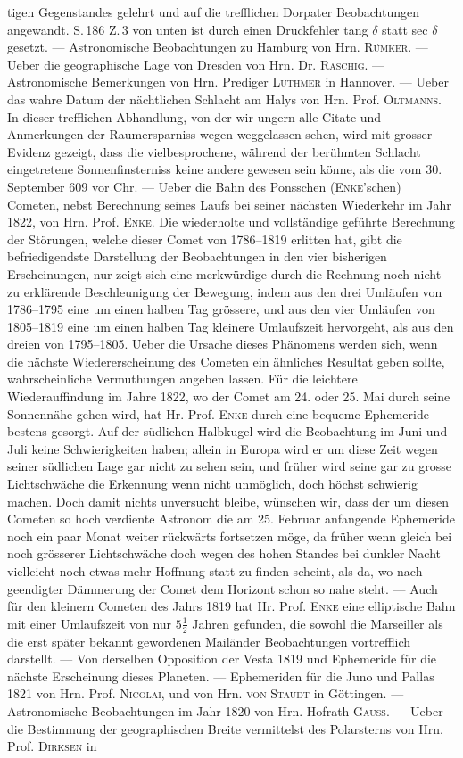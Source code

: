 \noindent tigen Gegenstandes gelehrt und auf die trefflichen Dorpater Beobachtungen angewandt. S.\,186 Z.\,3 von unten ist durch einen Druckfehler tang $\delta$ statt sec $\delta$ gesetzt. --- Astronomische Beobachtungen zu Hamburg von Hrn. \textsc{Rümker}. --- Ueber die geographische Lage von Dresden von Hrn. Dr. \textsc{Raschig}. --- Astronomische Bemerkungen von Hrn. Prediger \textsc{Luthmer} in Hannover. --- Ueber das wahre Datum der nächtlichen Schlacht am Halys von Hrn. Prof. \textsc{Oltmanns}. In dieser trefflichen Abhandlung, von der wir ungern alle Citate und Anmerkungen der Raumersparniss wegen weggelassen sehen, wird mit grosser Evidenz gezeigt, dass die vielbesprochene, während der berühmten Schlacht eingetretene Sonnenfinsterniss keine andere gewesen sein könne, als die vom 30. September 609 vor Chr. --- Ueber die Bahn des Ponsschen (\textsc{Enke}'schen) Cometen, nebst Berechnung seines Laufs bei seiner nächsten Wiederkehr im Jahr 1822, von Hrn. Prof. \textsc{Enke}. Die wiederholte und vollständige geführte Berechnung der Störungen, welche dieser Comet von 1786--1819 erlitten hat, gibt die befriedigendste Darstellung der Beobachtungen in den vier bisherigen Erscheinungen, nur zeigt sich eine merkwürdige durch die Rechnung noch nicht zu erklärende Beschleunigung der Bewegung, indem aus den drei Umläufen von 1786--1795 eine um einen halben Tag grössere, und aus den vier Umläufen von 1805--1819 eine um einen halben Tag kleinere Umlaufszeit hervorgeht, als aus den dreien von 1795--1805. Ueber die Ursache dieses Phänomens werden sich, wenn die nächste Wiedererscheinung des Cometen ein ähnliches Resultat geben sollte, wahrscheinliche Vermuthungen angeben lassen. Für die leichtere Wiederauffindung im Jahre 1822, wo der Comet am 24. oder 25. Mai durch seine Sonnennähe gehen wird, hat Hr. Prof. \textsc{Enke} durch eine bequeme Ephemeride bestens gesorgt. Auf der südlichen Halbkugel wird die Beobachtung im Juni und Juli keine Schwierigkeiten haben; allein in Europa wird er um diese Zeit wegen seiner südlichen Lage gar nicht zu sehen sein, und früher wird seine gar zu grosse Lichtschwäche die Erkennung wenn nicht unmöglich, doch höchst schwierig machen. Doch damit nichts unversucht bleibe, wünschen wir, dass der um diesen Cometen so hoch verdiente Astronom die am 25. Februar anfangende Ephemeride noch ein paar Monat weiter rückwärts fortsetzen möge, da früher wenn gleich bei noch grösserer Lichtschwäche doch wegen des hohen Standes bei dunkler Nacht vielleicht noch etwas mehr Hoffnung statt zu finden scheint, als da, wo nach geendigter Dämmerung der Comet dem Horizont schon so nahe steht. --- Auch für den kleinern Cometen des Jahrs 1819 hat Hr. Prof. \textsc{Enke} eine elliptische Bahn mit einer Umlaufszeit von nur $5\tfrac{1}{2}$ Jahren gefunden, die sowohl die Marseiller als die erst später bekannt gewordenen Mailänder Beobachtungen vortrefflich darstellt. --- Von derselben Opposition der Vesta 1819 und Ephemeride für die nächste Erscheinung dieses Planeten. --- Ephemeriden für die Juno und Pallas 1821 von Hrn. Prof. \textsc{Nicolai}, und von Hrn. \textsc{von Staudt} in Göttingen. --- Astronomische Beobachtungen im Jahr 1820 von Hrn. Hofrath \textsc{Gauss}. --- Ueber die Bestimmung der geographischen Breite vermittelst des Polarsterns von Hrn. Prof. \textsc{Dirksen} in 